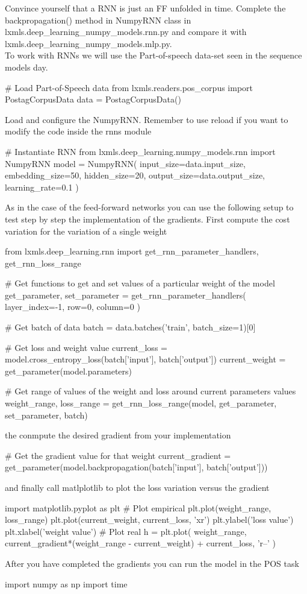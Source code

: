\begin{exercise}
\label{exercise:rnnnumpy}
Convince yourself that a RNN is just an FF unfolded in time. Complete the 
backpropagation() method in NumpyRNN class in lxmls.deep\_learning\_numpy\_models.rnn.py
and compare it with lxmls.deep\_learning\_numpy\_models.mlp.py.\\

\noindent To work with RNNs we will use the Part-of-speech data-set seen in the
sequence models day.
\begin{python}
# Load Part-of-Speech data 
from lxmls.readers.pos_corpus import PostagCorpusData
data = PostagCorpusData() 
\end{python}
\clearpage
\noindent Load and configure the NumpyRNN. Remember to use reload if you want to modify 
the code inside the rnns module
\begin{python}
# Instantiate RNN
from lxmls.deep_learning.numpy_models.rnn import NumpyRNN
model = NumpyRNN(
    input_size=data.input_size,
    embedding_size=50,
    hidden_size=20,
    output_size=data.output_size,
    learning_rate=0.1
)
\end{python}
As in the case of the feed-forward networks you can use the following setup to
test step by step the implementation of the gradients. First compute the cost
variation for the variation of a single weight
\begin{python}
from lxmls.deep_learning.rnn import get_rnn_parameter_handlers, get_rnn_loss_range

# Get functions to get and set values of a particular weight of the model
get_parameter, set_parameter = get_rnn_parameter_handlers(
    layer_index=-1,
    row=0, 
    column=0
)

# Get batch of data
batch = data.batches('train', batch_size=1)[0]

# Get loss and weight value
current_loss = model.cross_entropy_loss(batch['input'], batch['output'])
current_weight = get_parameter(model.parameters)

# Get range of values of the weight and loss around current parameters values
weight_range, loss_range = get_rnn_loss_range(model, get_parameter, set_parameter, batch)
\end{python}
the conmpute the desired gradient from your implementation
\begin{python}
# Get the gradient value for that weight
current_gradient = get_parameter(model.backpropagation(batch['input'], batch['output']))
\end{python}
and finally call matlplotlib to plot the loss variation versus the gradient
\begin{python}
import matplotlib.pyplot as plt
# Plot empirical
plt.plot(weight_range, loss_range)
plt.plot(current_weight, current_loss, 'xr')
plt.ylabel('loss value')
plt.xlabel('weight value')
# Plot real
h = plt.plot(
    weight_range,
    current_gradient*(weight_range - current_weight) + current_loss, 
    'r--'
)
\end{python}
\clearpage
After you have completed the gradients you can run the model in the POS task
\begin{python}
import numpy as np
import time


\end{python}
\end{exercise}
